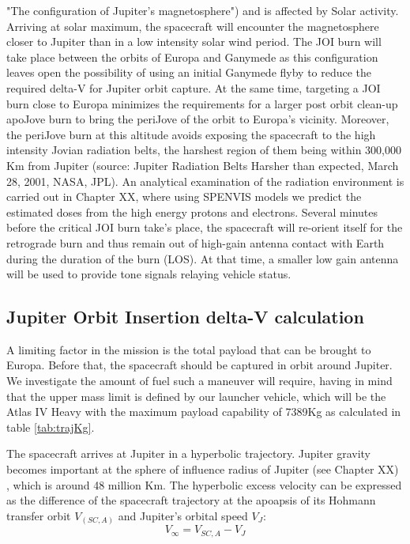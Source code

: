 "The configuration of Jupiter's magnetosphere") and is affected by Solar activity. Arriving at solar maximum, the spacecraft will encounter the magnetosphere closer to Jupiter than in a low intensity solar wind period. The JOI burn will take place between the orbits of Europa and Ganymede as this configuration leaves open the possibility of using an initial Ganymede flyby to reduce the required delta-V for Jupiter orbit capture. At the same time, targeting a JOI burn close to Europa minimizes the requirements for a larger post orbit clean-up apoJove burn to bring the periJove of the orbit to Europa’s vicinity. Moreover, the periJove burn at this altitude avoids exposing the spacecraft to the high intensity Jovian radiation belts, the harshest region of them being within 300,000 Km from Jupiter (source: Jupiter Radiation Belts Harsher than expected, March 28, 2001, NASA, JPL).
An analytical examination of the radiation environment is carried out in Chapter XX, where using SPENVIS models we predict the estimated doses from the high energy protons and electrons. Several minutes before the critical JOI burn take’s place, the spacecraft will re-orient itself for the retrograde burn and thus remain out of high-gain antenna contact with Earth during the duration of the burn (LOS). At that time, a smaller low gain antenna will be used to provide tone signals relaying vehicle status. 
\subsection{Jupiter Orbit Insertion delta-V calculation}
A limiting factor in the mission is the total payload that can be brought to Europa. Before that, the spacecraft should be captured in orbit around Jupiter. We investigate the amount of fuel such a maneuver will require, having in mind that the upper mass limit is defined by our launcher vehicle, which will be the Atlas IV Heavy with the maximum payload capability of 7389Kg as calculated in table \ref{tab:trajKg}.

The spacecraft arrives at Jupiter in a hyperbolic trajectory. Jupiter gravity becomes important at the sphere of influence radius of Jupiter (see Chapter XX)
, which is around 48 million Km. The hyperbolic excess velocity can be expressed as the difference of the spacecraft trajectory at the apoapsis of its Hohmann transfer orbit $V_(SC,A)$ and Jupiter’s orbital speed $V_J$:
\begin{equation}
V_\infty=V_{SC,A}-V_J
\end{equation}


